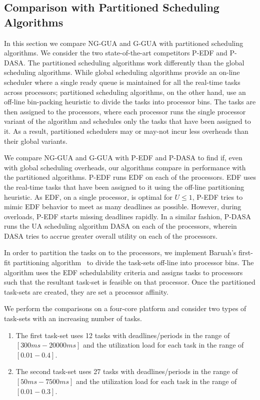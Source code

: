 \documentclass[12pt,dvips]{report}
\begin{document}
\subsection{Comparison with Partitioned Scheduling Algorithms}

In this section we compare NG-GUA and G-GUA with partitioned scheduling algorithms. We consider the two state-of-the-art competitors P-EDF and P-DASA. The partitioned scheduling algorithms work differently than the global scheduling algorithms. While global scheduling algorithms provide an on-line scheduler where a single ready queue is maintained for all the real-time tasks across processors; partitioned scheduling algorithms, on the other hand, use an off-line bin-packing heuristic to divide the tasks into processor bins. The tasks are then assigned to the processors, where each processor runs the single processor variant of the algorithm and schedules only the tasks that have been assigned to it. As a result, partitioned schedulers may or may-not incur less overheads than their global variants.

We compare NG-GUA and G-GUA with P-EDF and P-DASA to find if, even with global scheduling overheads, our algorithms compare in performance with the partitioned algorithms. P-EDF runs EDF on each of the processors. EDF uses the real-time tasks that have been assigned to it using the off-line partitioning heuristic. As EDF, on a single processor, is optimal for $U \le 1$, P-EDF tries to mimic EDF behavior to meet as many deadlines as possible. However, during overloads, P-EDF starts missing deadlines rapidly. In a similar fashion, P-DASA runs the UA scheduling algorithm DASA on each of the processors, wherein DASA tries to accrue greater overall utility on each of the processors.

In order to partition the tasks on to the processors, we implement Baruah's first-fit partitioning algorithm~\cite{baruah-part-06} to divide the task-sets off-line into processor bins. The algorithm uses the EDF schedulability criteria and assigns tasks to processors such that the resultant task-set is feasible on that processor. Once the partitioned task-sets are created, they are set a processor affinity.

We perform the comparisons on a four-core platform and consider two types of task-sets with an increasing number of tasks.
\begin{enumerate}
	\item The first task-set uses 12 tasks with deadlines/periods in the range of $[300ms-20000ms]$ and 
		the utilization load for each task in the range of $[0.01-0.4]$.
	\item The second task-set uses 27 tasks with deadlines/periods in the range of $[50ms-7500ms]$ and
		the utilization load for each task in the range of $[0.01-0.3]$. 
\end{enumerate}
\end{document}
